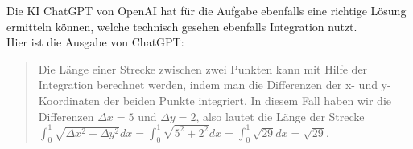 \documentclass[main.tex]{subfiles}
\begin{document}
Die KI ChatGPT von OpenAI hat für die Aufgabe ebenfalls eine richtige Lösung ermitteln können, welche technisch gesehen ebenfalls Integration nutzt.\\
Hier ist die Ausgabe von ChatGPT:
\begin{quote}
    \textcolor[rgb]{0.05,0.73,0.15}{
        Die Länge einer Strecke zwischen zwei Punkten kann mit Hilfe der Integration berechnet werden, indem man die Differenzen der x- und y-Koordinaten der beiden Punkte integriert. In diesem Fall haben wir die Differenzen $\Delta x=5$ und $\Delta y=2$, also lautet die Länge der Strecke
        $\int _{0}^{1}\sqrt{\Delta x^{2} +\Delta y^{2}} dx=\int _{0}^{1}\sqrt{5^{2} +2^{2}} dx=\int _{0}^{1}\sqrt{29} dx=\boxed{\sqrt{29}}$.
    }
\end{quote}
\end{document}
